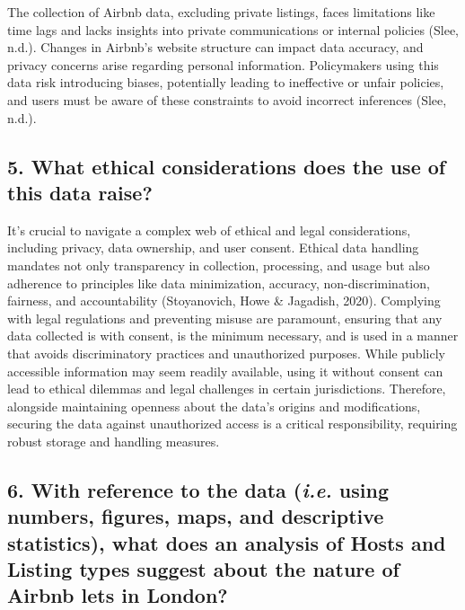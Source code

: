 \documentclass[
  a4paper,
  DIV=11,
  numbers=noendperiod]{scrartcl}
\begin{document}
The collection of Airbnb data, excluding private listings, faces
limitations like time lags and lacks insights into private
communications or internal policies (Slee, n.d.). Changes in Airbnb's
website structure can impact data accuracy, and privacy concerns arise
regarding personal information. Policymakers using this data risk
introducing biases, potentially leading to ineffective or unfair
policies, and users must be aware of these constraints to avoid
incorrect inferences (Slee, n.d.).

\hypertarget{what-ethical-considerations-does-the-use-of-this-data-raise}{%
\subsection{5. What ethical considerations does the use of this data
raise?}\label{what-ethical-considerations-does-the-use-of-this-data-raise}}

It's crucial to navigate a complex web of ethical and legal
considerations, including privacy, data ownership, and user consent.
Ethical data handling mandates not only transparency in collection,
processing, and usage but also adherence to principles like data
minimization, accuracy, non-discrimination, fairness, and accountability
(Stoyanovich, Howe \& Jagadish, 2020). Complying with legal regulations
and preventing misuse are paramount, ensuring that any data collected is
with consent, is the minimum necessary, and is used in a manner that
avoids discriminatory practices and unauthorized purposes. While
publicly accessible information may seem readily available, using it
without consent can lead to ethical dilemmas and legal challenges in
certain jurisdictions. Therefore, alongside maintaining openness about
the data's origins and modifications, securing the data against
unauthorized access is a critical responsibility, requiring robust
storage and handling measures.

\hypertarget{with-reference-to-the-data-i.e.-using-numbers-figures-maps-and-descriptive-statistics-what-does-an-analysis-of-hosts-and-listing-types-suggest-about-the-nature-of-airbnb-lets-in-london}{%
\subsection{\texorpdfstring{6. With reference to the data (\emph{i.e.}
using numbers, figures, maps, and descriptive statistics), what does an
analysis of Hosts and Listing types suggest about the nature of Airbnb
lets in
London?}{6. With reference to the data (i.e. using numbers, figures, maps, and descriptive statistics), what does an analysis of Hosts and Listing types suggest about the nature of Airbnb lets in London?}}\label{with-reference-to-the-data-i.e.-using-numbers-figures-maps-and-descriptive-statistics-what-does-an-analysis-of-hosts-and-listing-types-suggest-about-the-nature-of-airbnb-lets-in-london}}
\end{document}
